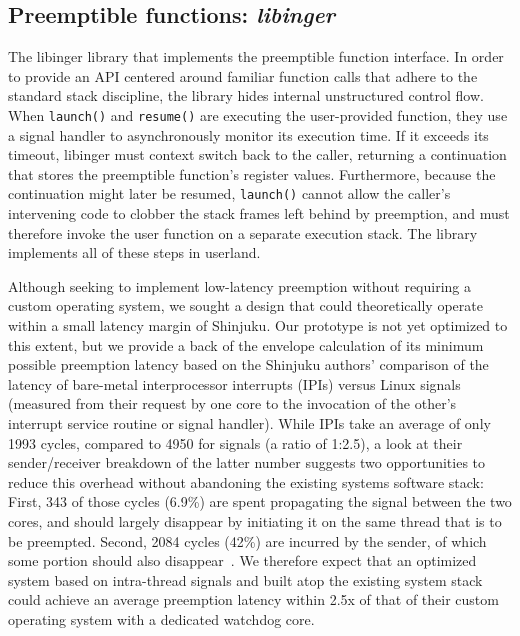 \subsection{Preemptible functions: \textit{libinger}}
\label{sec:libinger}

The libinger library that implements the preemptible function interface.  In order
to provide an API centered around familiar function calls that adhere to the standard
stack discipline, the library hides internal unstructured control flow.
When \texttt{launch()} and \texttt{resume()} are executing the user-provided
function, they use a signal handler to asynchronously monitor its execution time.  If
it exceeds its timeout, libinger must context switch back to the caller, returning a
continuation that stores the preemptible function's register values.  Furthermore,
because the continuation might later be resumed, \texttt{launch()} cannot allow the
caller's intervening code to clobber the stack frames left behind by preemption, and
must therefore invoke the user function on a separate execution stack.  The library
implements all of these steps in userland.

Although seeking to implement low-latency preemption without requiring a custom
operating system, we sought a design that could theoretically operate within a small
latency margin of Shinjuku.  Our prototype is not yet optimized to this extent, but
we provide a back of the envelope calculation of its minimum possible preemption
latency based on the Shinjuku
authors' comparison of the latency of bare-metal interprocessor interrupts (IPIs)
versus Linux signals (measured from their request by one core to the
invocation of the other's interrupt service routine or signal handler).  While
IPIs take an average of only 1993 cycles, compared to 4950 for
signals (a ratio of 1:2.5), a look at their sender/receiver breakdown of the latter
number suggests two opportunities to reduce this overhead without
abandoning the existing systems software stack:  First, 343 of those cycles (6.9\%)
are spent propagating the signal between the two cores, and should largely disappear
by initiating it on the same thread that is to be preempted.  Second, 2084 cycles
(42\%) are incurred by the sender, of which some portion should also
disappear~\cite{Kaffes:nsdi2019}.  We therefore expect that an optimized system based
on intra-thread signals and built atop the existing system stack could achieve an
average preemption latency within 2.5x of that of their custom operating
system with a dedicated watchdog core.

